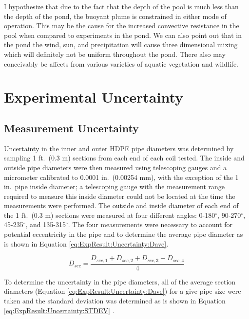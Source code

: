 I hypothesize that due to the fact that the depth of the pool is much less than the depth of the pond, the buoyant plume is constrained in either mode of operation. This may be the cause for the increased convective resistance in the pool when compared to experiments in the pond. We can also point out that in the pond the wind, sun, and precipitation will cause three dimensional mixing which will definitely not be uniform throughout the pond. There also may conceivably be affects from various varieties of aquatic vegetation and wildlife.

\section{Experimental Uncertainty}
\label{sec:ExpResult:Uncertainty}


\subsection{Measurement Uncertainty}
\label{subsec:ExpResult:Uncertainty:MeasuredUncerct}


Uncertainty in the inner and outer HDPE pipe diameters was determined by sampling 1 ft.\ (0.3 m) sections from each end of each coil tested. The inside and outside pipe diameters were then measured using telescoping gauges and a micrometer calibrated to 0.0001 in.\ (0.00254 mm), with the exception of the 1 in.\ pipe inside diameter; a telescoping gauge with the measurement range required to measure this inside diameter could not be located at the time the measurements were performed. The outside and inside diameter of each end of the 1 ft.\ (0.3 m) sections were measured at four different angles: 0-180$^\circ$, 90-270$^\circ$, 45-235$^\circ$, and 135-315$^\circ$. The four measurements were necessary to account for potential eccentricity in the pipe and to determine the average pipe diameter as is shown in Equation \ref{eq:ExpResult:Uncertainty:Dave}. 

\begin{equation}
	D_{sec} = \frac{D_{sec,1} + D_{sec,2} + D_{sec,3}+ D_{sec,4}}{4}
	\label{eq:ExpResult:Uncertainty:Dave}
\end{equation}

To determine the uncertainty in the pipe diameters, all of the average section diameters (Equation \ref{eq:ExpResult:Uncertainty:Dave}) for a give pipe size were taken and the standard deviation was determined as is shown in Equation \ref{eq:ExpResult:Uncertainty:STDEV} \citep{Taylor1997}.

